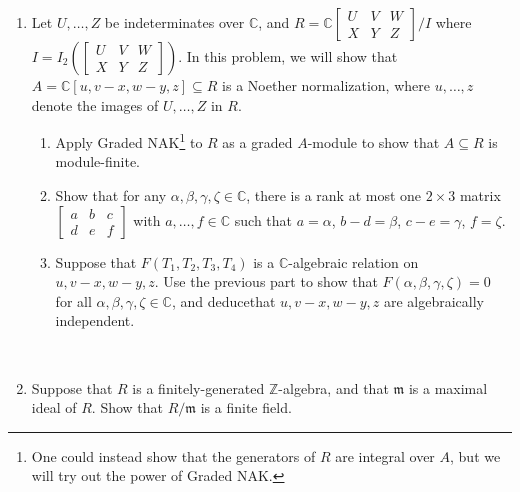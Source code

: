 \documentclass[12pt]{amsart}
\newcommand{\Z}{\mathbb{Z}}
\newcommand{\C}{\mathbb{C}}
\newcommand{\m}{\mathfrak{m}}
\begin{document}
\begin{enumerate}
\item Let $U,\dots,Z$ be indeterminates over $\C$, and $\displaystyle R= \C \begin{bmatrix} U & V & W \\ X & Y & Z \end{bmatrix} \Big/ I$ where $I=I_2\left(\begin{bmatrix} U & V & W \\ X & Y & Z \end{bmatrix}\right)$. In this problem, we will show that $A=\C[u, v-x, w-y, z] \subseteq R$ is a Noether normalization, where $u,\dots,z$ denote the images of $U,\dots,Z$ in $R$.
\begin{enumerate}
\item Apply Graded NAK\footnote{One could instead show that the generators of $R$ are integral over $A$, but we will try out the power of Graded NAK.} to $R$ as a graded $A$-module to show that $A\subseteq R$ is module-finite.
\item Show that for any $\alpha,\beta,\gamma,\zeta \in \C$, there is a rank at most one $2\times 3$ matrix $\begin{bmatrix}  a & b & c \\ d & e & f\end{bmatrix}$ with $a,\dots,f\in \C$ such that $a =\alpha$, $b-d = \beta$, $c-e= \gamma$, $f=\zeta$.
\item Suppose that $F(T_1,T_2,T_3,T_4)$ is a $\C$-algebraic relation on $u,v-x,w-y,z$. Use the previous part to show that $F(\alpha,\beta,\gamma,\zeta)=0$ for all $\alpha,\beta,\gamma,\zeta \in \C$, and deduce\footnotemark[1] that $u,v-x,w-y,z$ are algebraically independent.
\end{enumerate}

\


\item Suppose that $R$ is a finitely-generated $\Z$-algebra, and that $\m$ is a maximal ideal of $R$. Show that $R/\m$ is a finite field.





\end{enumerate}
\end{document}
